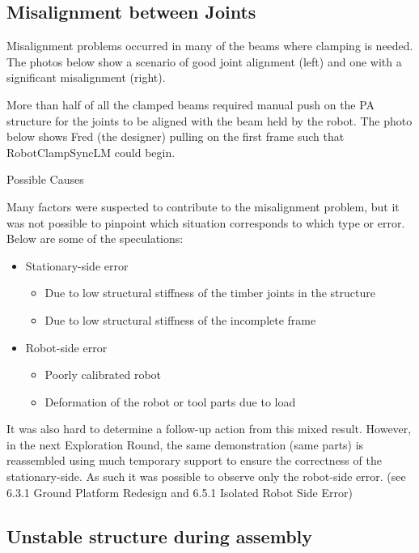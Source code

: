 \subsection{Misalignment between Joints}
\label{subsection:exploration_2_misalignment_between_joints}

Misalignment problems occurred in many of the beams where clamping is needed. The photos below show a scenario of good joint alignment (left) and one with a significant misalignment (right). 

More than half of all the clamped beams required manual push on the PA structure for the joints to be aligned with the beam held by the robot. The photo below shows Fred (the designer) pulling on the first frame such that RobotClampSyncLM could begin.

Possible Causes

Many factors were suspected to contribute to the misalignment problem, but it was not possible to pinpoint which situation corresponds to which type or error. Below are some of the speculations:
\begin{itemize}
    \item Stationary-side error
    \begin{itemize}
        \item Due to low structural stiffness of the timber joints in the structure
        \item Due to low structural stiffness of the incomplete frame
    \end{itemize}
    \item Robot-side error
    \begin{itemize}
        \item Poorly calibrated robot
        \item Deformation of the robot or tool parts due to load
    \end{itemize}
\end{itemize}
    It was also hard to determine a follow-up action from this mixed result. However, in the next Exploration Round, the same demonstration (same parts) is reassembled using much temporary support to ensure the correctness of the stationary-side. As such it was possible to observe only the robot-side error. (see 6.3.1 Ground Platform Redesign and 6.5.1 Isolated Robot Side Error)

\subsection{Unstable structure during assembly}
\label{subsection:exploration_2_unstable_structure_during_assembly}


